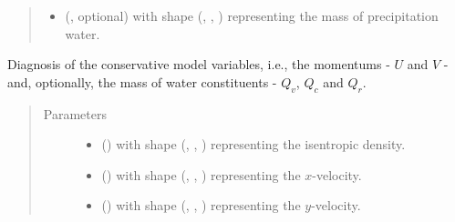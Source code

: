 \documentclass[letterpaper,10pt,english]{sphinxmanual}
\begin{document}
\begin{fulllineitems}
\begin{fulllineitems}
\begin{quote}
\begin{description}
\begin{itemize}
\item {} 
 (, optional) \textendash{}  with shape (, , ) representing the mass of precipitation water.

\end{itemize}

\end{description}\end{quote}

\end{fulllineitems}


\begin{fulllineitems}
\label{\detokenize{api:dycore.diagnostic_isentropic.DiagnosticIsentropic.get_conservative_variables}}
Diagnosis of the conservative model variables, i.e., the momentums - \(U\) and \(V\) -
and, optionally, the mass of water constituents - \(Q_v\), \(Q_c\) and \(Q_r\).
\begin{quote}\begin{description}
\item[{Parameters}] \leavevmode\begin{itemize}
\item {} 
 () \textendash{}  with shape (, , ) representing the isentropic density.

\item {} 
 () \textendash{}  with shape (, , ) representing the \(x\)-velocity.

\item {} 
 () \textendash{}  with shape (, , ) representing the \(y\)-velocity.


\end{itemize}
\end{description}
\end{quote}
\end{fulllineitems}
\end{fulllineitems}
\end{document}
